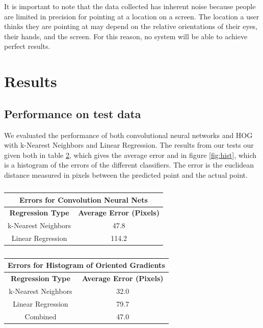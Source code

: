 \documentclass[10pt,twocolumn,letterpaper]{article}
\begin{document}
It is important to note that the data collected has inherent noise because people are limited in precision for pointing at a location on a screen.  The location a user thinks they are pointing at may depend on the relative orientations of their eyes, their hands, and the screen.  For this reason, no system will be able to achieve perfect results.

\section{Results}

\subsection{Performance on test data}
We evaluated the performance of both convolutional neural networks and HOG with k-Nearest Neighbors and Linear Regression. The results from our tests our given both in table \ref{table:meanErrors}, which gives the average error and in figure \ref{fig:hist}, which is a histogram of the errors of the different classifiers. The error is the euclidean distance measured in pixels between the predicted point and the actual point.

\begin{table}
	\caption{}
	\begin{center}
		\begin{tabular}{|c|c|}
			\hline
			\multicolumn{2}{|c|}{\textbf{Errors for Convolution Neural Nets}}\\\hline
			\textbf{Regression Type} & \textbf{Average Error (Pixels)} \\\hline
			k-Nearest Neighbors & 47.8 \\\hline
			Linear Regression &  114.2 \\\hline	
		\end{tabular}
		\begin{tabular}{|c|c|}
			\hline
			\multicolumn{2}{|c|}{\textbf{Errors for Histogram of Oriented Gradients}} \\\hline
			\textbf{Regression Type} & \textbf{Average Error (Pixels)} \\\hline
			k-Nearest Neighbors & 32.0\\\hline
			Linear Regression & 79.7 \\\hline
			Combined & 47.0 \\\hline
		\end{tabular}
	\end{center}
	\label{table:meanErrors}
\end{table}
\end{document}
